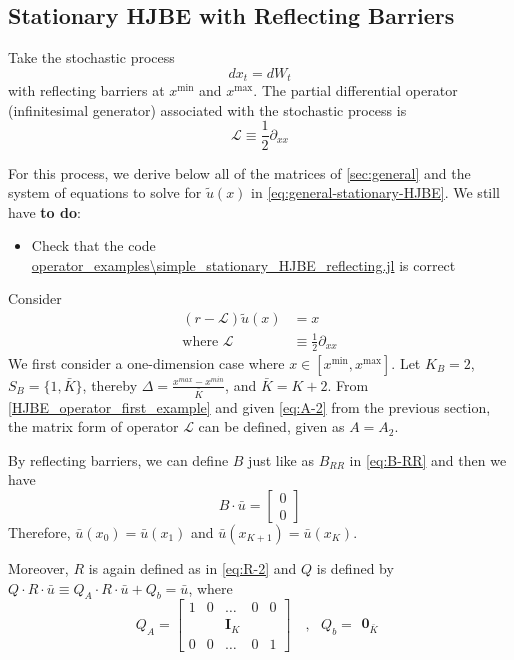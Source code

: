\documentclass[11pt]{article}
\newcommand{\D}[1][]{\ensuremath{\partial_{#1}}}
\begin{document}
\subsection{Stationary HJBE with Reflecting Barriers}
Take the stochastic process
$$
d x_t = d W_t
$$
with reflecting barriers at $x^{\min}$ and $x^{\max}$.  The partial differential operator (infinitesimal generator) associated with the stochastic process is
$$
	\mathcal{L} \equiv \frac{1}{2}\D[xx]
$$

For this process, we derive below all of the matrices of \cref{sec:general} and the system of equations to solve for $\tilde{u}(x)$ in \cref{eq:general-stationary-HJBE}. We still have \textbf{to do}:
\begin{itemize}
	\item Check that the code \url{operator_examples\simple_stationary_HJBE_reflecting.jl} is correct
\end{itemize}
Consider
\begin{align}
(r - \mathcal{L} )\tilde{u}(x) &= x\label{HJBE_reflecting_barriers_PDE}\\
\text{where }\mathcal{L}&\equiv \frac{1}{2}\partial_{xx}\label{HJBE_operator_first_example}
\end{align}
We first consider a one-dimension case where $x\in [x^{\min},x^{\max}]$. Let $K_B = 2$, $S_B = \{1,\bar{K}\}$, thereby $\Delta  = \frac{x^{max}-x^{min}}{\bar{K}}$, and $\bar{K} = K+2$. From \eqref{HJBE_operator_first_example} and given \eqref{eq:A-2} from the previous section, the matrix form of operator $\mathcal{L}$ can be defined, given as $A = A_2$.

By reflecting barriers, we can define $B$ just like as $B_{RR}$ in \eqref{eq:B-RR} and then we have
\begin{equation}
B\cdot\bar{u} = \begin{bmatrix}
0\\
0
\end{bmatrix}
\end{equation}
Therefore, $\bar{u}(x_0) = \bar{u}(x_1)$ and $\bar{u}(x_{K+1}) = \bar{u}(x_K)$.

Moreover, $R$ is again defined as in \eqref{eq:R-2} and $Q$ is defined by $Q\cdot R\cdot\bar{u}\equiv Q_A\cdot R\cdot\bar{u}+Q_b = \bar{u}$, where
\begin{equation}
Q_A = \begin{bmatrix}
1& 0&\dots&0&0\\
 & & \mathbf{I}_K & & \\
0&0&\dots&0&1
\end{bmatrix}%
\quad , \text{ } Q_b = \begin{matrix}
\mathbf{0}_{\bar{K}}
\end{matrix}%
\end{equation}
\end{document}
